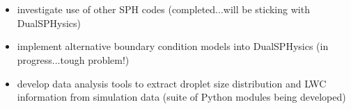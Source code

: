 \section{\thesec}
\label{sec:future_work}

\begin{frame}{\thesec}{\thesubsec}
  \vspace*{-2\baselineskip}
  \begin{itemize}
    \item{
      investigate use of other SPH codes (completed...will be sticking with DualSPHysics)
    }
    \vspace*{\baselineskip}
    \item{
      implement alternative boundary condition models into DualSPHysics (in progress...tough problem!)
    }
    \vspace*{\baselineskip}
    \item{
      develop data analysis tools to extract droplet size distribution and LWC information from simulation data (suite of Python modules being developed)
    }
  \end{itemize}
\end{frame}

